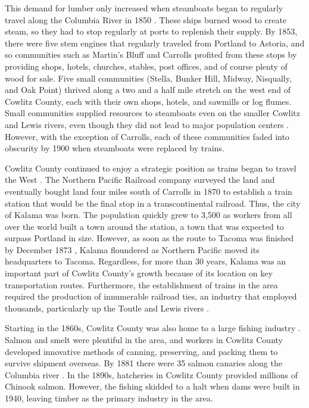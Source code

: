 This demand for lumber only increased when steamboats began to regularly travel along the Columbia River in 1850 \citep[87-91]{urrutia_1998}. These ships burned wood to create steam, so they had to stop regularly at ports to replenish their supply. By 1853, there were five stem engines that regularly traveled from Portland to Astoria, and so communities such as Martin's Bluff and Carrolls profited from these stops by providing shops, hotels, churches, stables, post offices, and of course plenty of wood for sale. Five small communities (Stella, Bunker Hill, Midway, Nisqually, and Oak Point) thrived along a two and a half mile stretch on the west end of Cowlitz County, each with their own shops, hotels, and sawmills or log flumes. Small communities supplied resources to steamboats even on the smaller Cowlitz and Lewis rivers, even though they did not lead to major population centers \citep[99-109]{urrutia_1998}. However, with the exception of Carrolls, each of these communities faded into obscurity by 1900 when steamboats were replaced by trains.

Cowlitz County continued to enjoy a strategic position as trains began to travel the West \citep[92-98]{urrutia_1998}. The Northern Pacific Railroad company surveyed the land and eventually bought land four miles south of Carrolls in 1870 to establish a train station that would be the final stop in a transcontinental railroad. Thus, the city of Kalama was born. The population quickly grew to 3,500 as workers from all over the world built a town around the station, a town that was expected to surpass Portland in size. However, as soon as the route to Tacoma was finished by December 1873 \citep[48]{olson_1948}, Kalama floundered as Northern Pacific moved its headquarters to Tacoma. Regardless, for more than 30 years, Kalama was an important part of Cowlitz County's growth because of its location on key transportation routes. Furthermore, the establishment of trains in the area required the production of innumerable railroad ties, an industry that employed thousands, particularly up the Toutle and Lewis rivers \citep[119]{urrutia_1998}.

Starting in the 1860s, Cowlitz County was also home to a large fishing industry \citep[120-124]{urrutia_1998}. Salmon and smelt were plentiful in the area, and workers in Cowlitz County developed innovative methods of canning, preserving, and packing them to survive shipment overseas. By 1881 there were 35 salmon canaries along the Columbia river \citep[31]{olson_1948}. In the 1890s, hatcheries in Cowlitz County provided millions of Chinook salmon. However, the fishing skidded to a halt when dams were built in 1940, leaving timber as the primary industry in the area.

